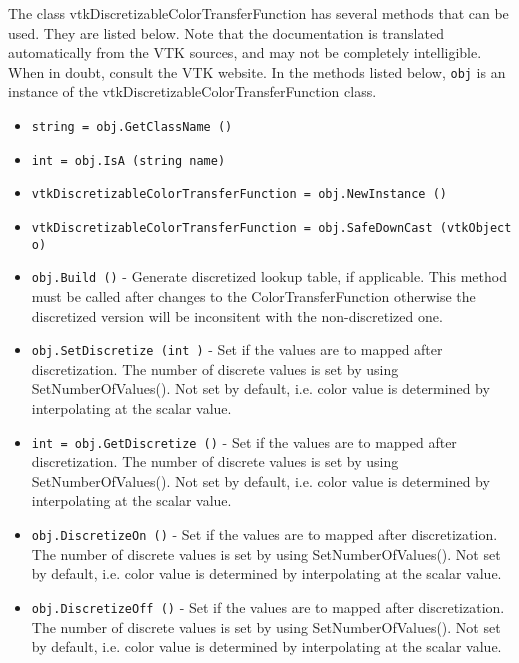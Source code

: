 The class vtkDiscretizableColorTransferFunction has several methods that can be used.
  They are listed below.
Note that the documentation is translated automatically from the VTK sources,
and may not be completely intelligible.  When in doubt, consult the VTK website.
In the methods listed below, \verb|obj| is an instance of the vtkDiscretizableColorTransferFunction class.
\begin{itemize}
\item  \verb|string = obj.GetClassName ()|

\item  \verb|int = obj.IsA (string name)|

\item  \verb|vtkDiscretizableColorTransferFunction = obj.NewInstance ()|

\item  \verb|vtkDiscretizableColorTransferFunction = obj.SafeDownCast (vtkObject o)|

\item  \verb|obj.Build ()| -  Generate discretized lookup table, if applicable.
 This method must be called after changes to the ColorTransferFunction
 otherwise the discretized version will be inconsitent with the 
 non-discretized one.

\item  \verb|obj.SetDiscretize (int )| -  Set if the values are to mapped after discretization. The
 number of discrete values is set by using SetNumberOfValues().
 Not set by default, i.e. color value is determined by
 interpolating at the scalar value.

\item  \verb|int = obj.GetDiscretize ()| -  Set if the values are to mapped after discretization. The
 number of discrete values is set by using SetNumberOfValues().
 Not set by default, i.e. color value is determined by
 interpolating at the scalar value.

\item  \verb|obj.DiscretizeOn ()| -  Set if the values are to mapped after discretization. The
 number of discrete values is set by using SetNumberOfValues().
 Not set by default, i.e. color value is determined by
 interpolating at the scalar value.

\item  \verb|obj.DiscretizeOff ()| -  Set if the values are to mapped after discretization. The
 number of discrete values is set by using SetNumberOfValues().
 Not set by default, i.e. color value is determined by
 interpolating at the scalar value.


\end{itemize}
